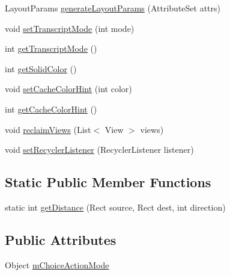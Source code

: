 \begin{DoxyCompactItemize}
\item 
Layout\+Params \hyperlink{classit_1_1sephiroth_1_1android_1_1library_1_1widget_1_1_abs_h_list_view_a2048556bb8794546891af3957a6a17a9}{generate\+Layout\+Params} (Attribute\+Set attrs)
\item 
void \hyperlink{classit_1_1sephiroth_1_1android_1_1library_1_1widget_1_1_abs_h_list_view_a8b67a85811d964b7e821ac0f18894381}{set\+Transcript\+Mode} (int mode)
\item 
int \hyperlink{classit_1_1sephiroth_1_1android_1_1library_1_1widget_1_1_abs_h_list_view_a64d783a532a2d0ab6f4148ae76ccee1c}{get\+Transcript\+Mode} ()
\item 
int \hyperlink{classit_1_1sephiroth_1_1android_1_1library_1_1widget_1_1_abs_h_list_view_af43ff1455582b44823c19f2ec4b29370}{get\+Solid\+Color} ()
\item 
void \hyperlink{classit_1_1sephiroth_1_1android_1_1library_1_1widget_1_1_abs_h_list_view_ac74759ebaec38b7f3c48ef99121121c3}{set\+Cache\+Color\+Hint} (int color)
\item 
int \hyperlink{classit_1_1sephiroth_1_1android_1_1library_1_1widget_1_1_abs_h_list_view_a7b1d5ed37a35c4a375863de5007be85b}{get\+Cache\+Color\+Hint} ()
\item 
void \hyperlink{classit_1_1sephiroth_1_1android_1_1library_1_1widget_1_1_abs_h_list_view_a0290dd0298e1f525c82c2cb0a432d037}{reclaim\+Views} (List$<$ View $>$ views)
\item 
void \hyperlink{classit_1_1sephiroth_1_1android_1_1library_1_1widget_1_1_abs_h_list_view_a3eadd4738e3c529aafefa4f6bb1f5b94}{set\+Recycler\+Listener} (Recycler\+Listener listener)
\end{DoxyCompactItemize}
\subsection*{Static Public Member Functions}
\begin{DoxyCompactItemize}
\item 
static int \hyperlink{classit_1_1sephiroth_1_1android_1_1library_1_1widget_1_1_abs_h_list_view_a3d6b7c8dfbeb4926a5a3c4bd12acf0ce}{get\+Distance} (Rect source, Rect dest, int direction)
\end{DoxyCompactItemize}
\subsection*{Public Attributes}
\begin{DoxyCompactItemize}
\item 
Object \hyperlink{classit_1_1sephiroth_1_1android_1_1library_1_1widget_1_1_abs_h_list_view_a7bcd2aa1d2ec0020dfc02841dd3d0556}{m\+Choice\+Action\+Mode}
\end{DoxyCompactItemize}
